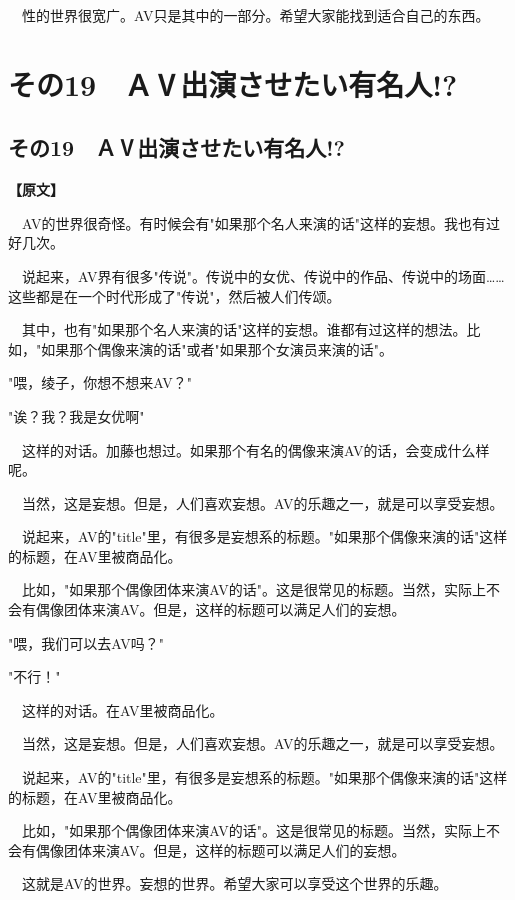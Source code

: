 \documentclass[12pt,UTF8]{ctexbook}
\begin{document}
{{　性的世界很宽广。AV只是其中的一部分。希望大家能找到适合自己的东西。
}

\chapter{その19　ＡⅤ出演させたい有名人!?}
\label{chap:19}
\section{その19　ＡⅤ出演させたい有名人!?}

\vspace{1ex}
\parbox{0.9\linewidth}{
\textbf{【原文】}\par

　AV的世界很奇怪。有时候会有"如果那个名人来演的话"这样的妄想。我也有过好几次。

　说起来，AV界有很多"传说"。传说中的女优、传说中的作品、传说中的场面……这些都是在一个时代形成了"传说"，然后被人们传颂。

　其中，也有"如果那个名人来演的话"这样的妄想。谁都有过这样的想法。比如，"如果那个偶像来演的话"或者"如果那个女演员来演的话"。

"喂，绫子，你想不想来AV？"

"诶？我？我是女优啊"

　这样的对话。加藤也想过。如果那个有名的偶像来演AV的话，会变成什么样呢。

　当然，这是妄想。但是，人们喜欢妄想。AV的乐趣之一，就是可以享受妄想。

　说起来，AV的"title"里，有很多是妄想系的标题。"如果那个偶像来演的话"这样的标题，在AV里被商品化。

　比如，"如果那个偶像团体来演AV的话"。这是很常见的标题。当然，实际上不会有偶像团体来演AV。但是，这样的标题可以满足人们的妄想。

"喂，我们可以去AV吗？"

"不行！"

　这样的对话。在AV里被商品化。

　当然，这是妄想。但是，人们喜欢妄想。AV的乐趣之一，就是可以享受妄想。

　说起来，AV的"title"里，有很多是妄想系的标题。"如果那个偶像来演的话"这样的标题，在AV里被商品化。

　比如，"如果那个偶像团体来演AV的话"。这是很常见的标题。当然，实际上不会有偶像团体来演AV。但是，这样的标题可以满足人们的妄想。

　这就是AV的世界。妄想的世界。希望大家可以享受这个世界的乐趣。
}

}
\end{document}
